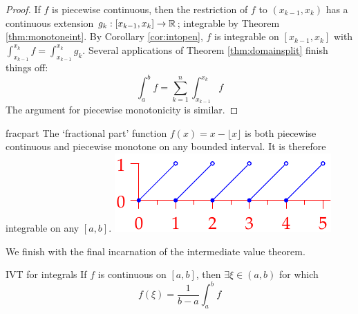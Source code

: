 \begin{proof}
If $f$ is piecewise continuous, then the restriction of $f$ to $(x_{k-1},x_k)$ has a continuous extension $g_k:[x_{k-1},x_k]\to\mathbb{R}$; integrable by Theorem \ref{thm:monotoneint}. By Corollary \ref{cor:intopen}, $f$ is integrable on $[x_{k-1},x_k]$ with $\int_{x_{k-1}}^{x_k}f=\int_{x_{k-1}}^{x_k}g_k$. Several applications of Theorem \ref{thm:domainsplit} finish things off:
\[\int_a^bf=\sum_{k=1}^n\int_{x_{k-1}}^{x_k}f\]
The argument for piecewise monotonicity is similar.
\end{proof}

\begin{example}[lower separated=false, sidebyside, sidebyside align=top seam, sidebyside gap=0pt, righthand width=0.35\linewidth]{}{fracpart}
The `fractional part' function $f(x)=x-\lfloor x\rfloor$ is both piecewise continuous and piecewise monotone on any bounded interval. It is therefore integrable on any $[a,b]$.
\tcblower
\flushright\includegraphics{fracpart}
\end{example}

\goodbreak

We finish with the final incarnation of the intermediate value theorem.

\begin{cor}{IVT for integrals}{}
If $f$ is continuous on $[a,b]$, then $\exists \xi\in (a,b)$ for which
\[f(\xi)=\frac 1{b-a}\int_a^bf\]
\end{cor}

